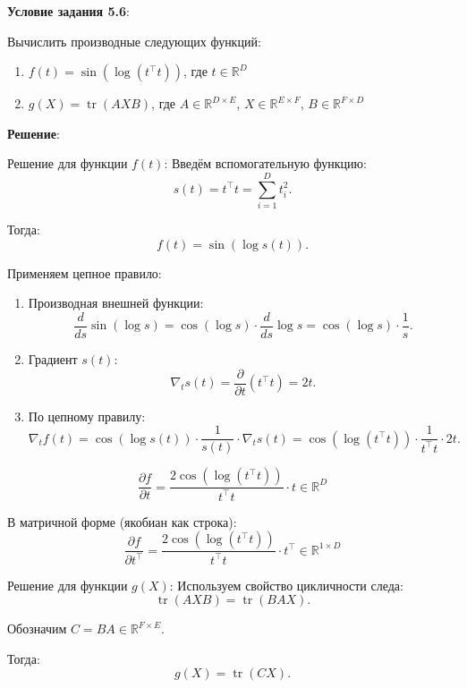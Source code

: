 \documentclass[pract]{SCWorks}
\begin{document}
    \textbf{Условие задания 5.6}:

    Вычислить производные следующих функций:
    \begin{enumerate}
        \item[$\bullet$] $f(t) = \sin(\log(t^\top t))$, где $t \in \mathbb{R}^D$
        \item[$\bullet$] $g(X) = \operatorname{tr}(AXB)$, где $A \in \mathbb{R}^{D \times E}$, $X \in \mathbb{R}^{E \times F}$, $B \in \mathbb{R}^{F \times D}$
    \end{enumerate}

    \textbf{Решение}:

    Решение для функции $f(t)$:
    Введём вспомогательную функцию:
    \[
    s(t) = t^\top t = \sum_{i=1}^D t_i^2.
    \]

    Тогда:
    \[
    f(t) = \sin(\log s(t)).
    \]

    Применяем цепное правило:

    \begin{enumerate}
        \item[$\bullet$] Производная внешней функции:
        \[
        \frac{d}{ds} \sin(\log s) = \cos(\log s) \cdot \frac{d}{ds} \log s
        = \cos(\log s) \cdot \frac{1}{s}.
        \]

        \item[$\bullet$] Градиент $s(t)$:
        \[
        \nabla_t s(t) = \frac{\partial}{\partial t} (t^\top t) = 2t.
        \]

        \item[$\bullet$] По цепному правилу:
        \[
        \nabla_t f(t) = \cos(\log s(t)) \cdot \frac{1}{s(t)} \cdot \nabla_t s(t)
        = \cos(\log(t^\top t)) \cdot \frac{1}{t^\top t} \cdot 2t.
        \]
    \end{enumerate}

    \[
    \boxed{\dfrac{\partial f}{\partial t} = \dfrac{2\cos\left(\log(t^\top t)\right)}{t^\top t} \cdot t \in \mathbb{R}^D}
    \]

    В матричной форме (якобиан как строка):
    \[
    \boxed{\dfrac{\partial f}{\partial t^\top} = \dfrac{2\cos\left(\log(t^\top t)\right)}{t^\top t} \cdot t^\top \in \mathbb{R}^{1 \times D}}
    \]

    Решение для функции $g(X)$:
    Используем свойство цикличности следа:
    \[
    \operatorname{tr}(AXB) = \operatorname{tr}(BAX).
    \]

    Обозначим $C = BA \in \mathbb{R}^{F \times E}$.

    Тогда:
    \[
    g(X) = \operatorname{tr}(CX).
    \]
\end{document}
